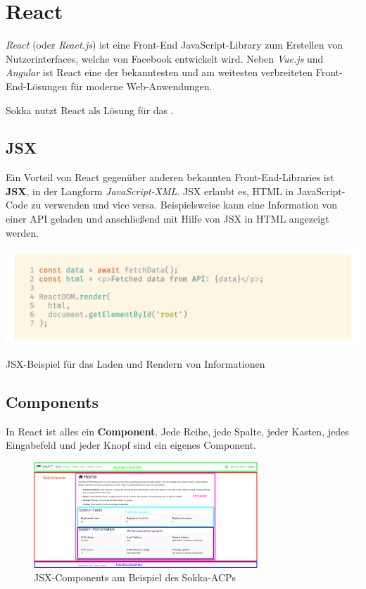 \section{React}

\textit{React} (oder \textit{React.js}) ist eine Front-End JavaScript-Library zum Erstellen von Nutzerinterfaces, welche von Facebook entwickelt wird. Neben \textit{Vue.js} und \textit{Angular} ist React eine der bekanntesten und am weitesten verbreiteten Front-End-Lösungen für moderne Web-Anwendungen. \cite{nadafkhanrathod2020}

Sokka nutzt React als Lösung für das .

\subsection{JSX}

Ein Vorteil von React gegenüber anderen bekannten Front-End-Libraries ist \textbf{JSX}, in der Langform \textit{JavaScript-XML}. JSX erlaubt es, HTML in JavaScript-Code zu verwenden und vice versa. Beispielsweise kann eine Information von einer API geladen und anschließend mit Hilfe von JSX in HTML angezeigt werden.

\begin{code}[h]
    \centering
    \includegraphics[width=1\textwidth]{images/React/jsx.png}
    \vspace{-25pt}
    \caption{JSX-Beispiel für das Laden und Rendern von Informationen}
\end{code}

\subsection{Components}

In React ist alles ein \textbf{Component}. Jede Reihe, jede Spalte, jeder Kasten, jedes Eingabefeld und jeder Knopf sind ein eigenes Component.

\begin{figure}[h]
    \begin{center}
        \includegraphics[width=0.75\textwidth]{images/React/components.png}
        \caption{JSX-Components am Beispiel des Sokka-ACPs}
    \end{center}
\end{figure}

